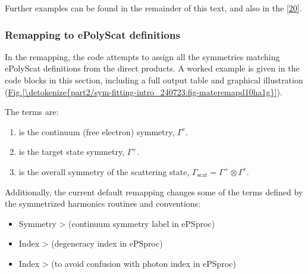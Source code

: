 \documentclass[letterpaper,table,10pt,english]{jupyterBook}
\begin{document}
\sphinxAtStartPar
Further examples can be found in the remainder of this text, and also in the  {[}\hyperlink{cite.backmatter/bibliography:id681}{20}{]}.


\subsubsection{Remapping to ePolyScat definitions}
\label{\detokenize{part2/sym-fitting-intro_240723:remapping-to-epolyscat-definitions}}\label{\detokenize{part2/sym-fitting-intro_240723:sec-basis-sets-remapping-to-eps}}
\sphinxAtStartPar
In the remapping, the code attempts to assign all the symmetries matching ePolyScat definitions from the direct products. A worked example is given in the code blocks in this section, including a full output table and graphical illustration (\hyperref[\detokenize{part2/sym-fitting-intro_240723:fig-materemapd10ha1g}]{Fig.\@ \ref{\detokenize{part2/sym-fitting-intro_240723:fig-materemapd10ha1g}}}).

\sphinxAtStartPar
The terms are:
\begin{enumerate}
%
\item {} 
\sphinxAtStartPar
{} is the continuum (free electron) symmetry, \(\Gamma^{e}\).

\item {} 
\sphinxAtStartPar
{} is the target state symmetry, \(\Gamma^{+}\).

\item {} 
\sphinxAtStartPar
{} is the overall symmetry of the scattering state, \(\Gamma_{\mathrm{scat}}=\Gamma^{+}\otimes\Gamma^{e}\).

\end{enumerate}

\sphinxAtStartPar
Additionally, the current default remapping changes some of the terms defined by the symmetrized harmonics routines and conventions:
\begin{itemize}
\item {} 
\sphinxAtStartPar
Symmetry  >  (continuum symmetry label in ePSproc)

\item {} 
\sphinxAtStartPar
Index  >  (degeneracy index in ePSproc)

\item {} 
\sphinxAtStartPar
Index  >  (to avoid confusion with photon index  in ePSproc)

\end{itemize}
\end{document}
